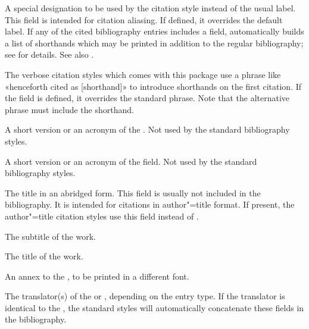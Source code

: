 \documentclass{ltxdockit}[2011/03/25]
\begin{document}
\begin{fieldlist}

A special designation to be used by the citation style instead of the usual label. This field is intended for citation aliasing. If defined, it overrides the default label. If any of the cited bibliography entries includes a  field,  automatically builds a list of shorthands which may be printed in addition to the regular bibliography; see  for details. See also .


The verbose citation styles which comes with this package use a phrase like «henceforth cited as [shorthand]» to introduce shorthands on the first citation. If the  field is defined, it overrides the standard phrase. Note that the alternative phrase must include the shorthand.


A short version or an acronym of the . Not used by the standard bibliography styles.


A short version or an acronym of the  field. Not used by the standard bibliography styles.


The title in an abridged form. This field is usually not included in the bibliography. It is intended for citations in author"=title format. If present, the author"=title citation styles use this field instead of .


The subtitle of the work.


The title of the work.


An annex to the , to be printed in a different font.


The translator(s) of the  or , depending on the entry type. If the translator is identical to the , the standard styles will automatically concatenate these fields in the bibliography.


\end{fieldlist}
\end{document}
